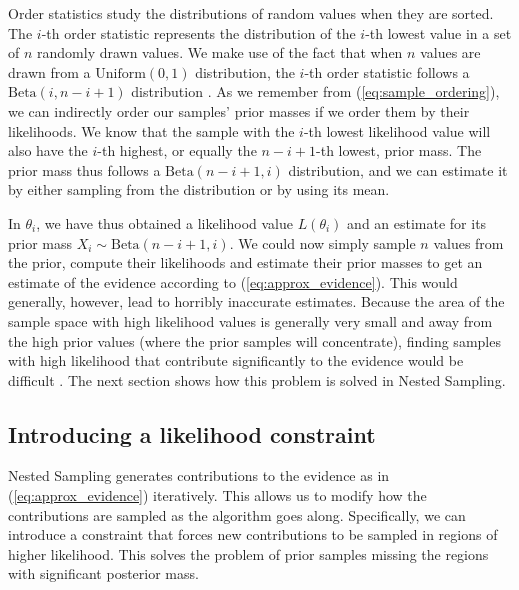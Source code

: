 \documentclass[12pt, a4paper]{report}
\begin{document}
Order statistics study the distributions of random values when they are sorted.
The $i$-th order statistic represents the distribution of the $i$-th lowest value in a set of $n$ randomly drawn values.
We make use of the fact that when $n$ values are drawn from a $\textrm{Uniform}(0,1)$ distribution, the $i$-th order statistic follows a $\textrm{Beta}(i, n-i+1)$ distribution \cite[63]{computational_stats}.
As we remember from (\ref{eq:sample_ordering}), we can indirectly order our samples' prior masses if we order them by their likelihoods.
We know that the sample with the $i$-th lowest likelihood value will also have the $i$-th highest, or equally the $n-i+1$-th lowest, prior mass.
The prior mass thus follows a $\textrm{Beta}(n-i+1, i)$ distribution, and we can estimate it by either sampling from the distribution or by using its mean.

In $\theta_{i}$, we have thus obtained a likelihood value $L(\theta_{i})$ and an estimate for its prior mass $X_{i} \sim  \textrm{Beta}(n-i+1, i)$.
We could now simply sample $n$ values from the prior, compute their likelihoods and estimate their prior masses to get an estimate of the evidence according to (\ref{eq:approx_evidence}).
This would generally, however, lead to horribly inaccurate estimates.
Because the area of the sample space with high likelihood values is generally very small and away from the high prior values (where the prior samples will concentrate), finding samples with high likelihood that contribute significantly to the evidence would be difficult \cite[7]{skilling}.
The next section shows how this problem is solved in Nested Sampling.

\subsection{Introducing a likelihood constraint} 
Nested Sampling generates contributions to the evidence as in (\ref{eq:approx_evidence}) iteratively.
This allows us to modify how the contributions are sampled as the algorithm goes along.
Specifically, we can introduce a constraint that forces new contributions to be sampled in regions of higher likelihood.
This solves the problem of prior samples missing the regions with significant posterior mass.
\end{document}
